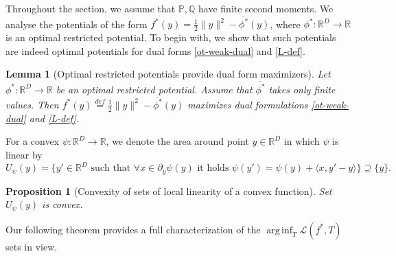 \documentclass{article} %
\DeclareMathOperator*{\arginf}{arg\,inf}
\newtheorem{lemma}{Lemma}
\newtheorem{proposition}{Proposition}
\begin{document}
\vspace{-2mm}Throughout the section, we assume that $\mathbb{P},\mathbb{Q}$ have finite second moments. We analyse the potentials of the form $f^{*}(y)=\frac{1}{2}\|y\|^{2}-\overline{\phi^{*}}(y)$, where $\phi^{*}:\mathbb{R}^{D}\rightarrow\mathbb{R}$ is an optimal restricted potential. To begin with, we show that such potentials are indeed optimal potentials for dual forms \eqref{ot-weak-dual} and \eqref{L-def}.
\begin{lemma}[Optimal restricted potentials provide dual form maximizers] Let $\phi^{*}:\mathbb{R}^{D}\rightarrow\mathbb{R}$ be an optimal restricted potential. Assume that $\overline{\phi^{*}}$ takes only finite values. Then $f^{*}(y)\stackrel{def}{=}\frac{1}{2}\|y\|^{2}-\overline{\phi^{*}}(y)$ maximizes dual formulations \eqref{ot-weak-dual} and \eqref{L-def}.
\label{lemma-restricted-to-f}\vspace{-2mm}
\end{lemma}
For a convex $\psi:\mathbb{R}^{D}\rightarrow\mathbb{R}$, we denote the area around point $y\in\mathbb{R}^{D}$ in which $\psi$ is linear by
\begin{equation}U_{\psi}(y)=\{y'\in \mathbb{R}^{D}\mbox{ such that }\forall x\in\partial_{y}\psi(y)\mbox{ it holds } \psi(y')=\psi(y)+\langle x,y'-y\rangle\}\supseteq \{y\}.\label{u-def}\end{equation}
\begin{proposition}[Convexity of sets of local linearity of a convex function]Set $U_{\psi}(y)$ is convex.
\label{prop-u-convex}\vspace{-2mm}\end{proposition}
Our following theorem provides a full characterization of the $\arginf_{T}\mathcal{L}(f^{*},T)$ sets in view.
\end{document}
